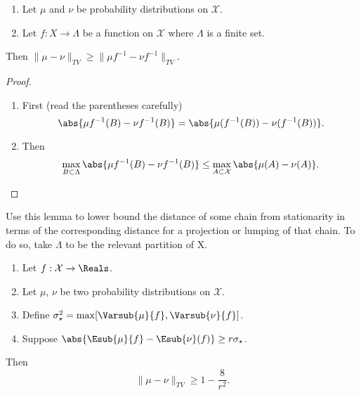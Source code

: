 \documentclass[12pt]{article}
\begin{document}
\begin{lemma}
    \label{thm:convergencestationary:lem710}
    \begin{enumerate}
        \item
            Let \( \mu \) and \( \nu \) be probability distributions on \(
            \mathcal{X} \).
        \item
            Let \( f:X \to \Lambda \) be a function on \( \mathcal{X} \)
            where \( \Lambda \) is a finite set.
    \end{enumerate}
    Then \( \| \mu - \nu \|_{TV} \ge \| \mu f^{-1} - \nu f^{-1} \|_{TV} \).
\end{lemma}

\begin{proof}
    \begin{enumerate}
        \item
            First (read the parentheses carefully)
            \[
                \abs{\mu f^{-1}(B) - \nu f^{-1}(B)} = \abs{\mu (f^{-1}(B))
                - \nu (f^{-1}(B))}.
            \]
        \item
            Then
            \[
                \max_{B \subset \Lambda}\abs{\mu f^{-1}(B) - \nu f^{-1}(B)}
                \le \max_{A \subset \mathcal{X}}\abs{\mu (A) - \nu (A)}.
            \]

    \end{enumerate}
\end{proof}

\begin{remark}
    Use this lemma to lower bound the distance of some chain from
    stationarity in terms of the corresponding distance for a projection
    or lumping of that chain.  To do so, take \( \Lambda \) to be the
    relevant partition of X.
\end{remark}

\begin{proposition}
    \label{thm:convergencestationary:prop79}
    \begin{enumerate}
        \item
            Let \( f:\mathcal{X} \to \Reals \).
        \item
            Let \( \mu \), \( \nu \) be two probability distributions on
            \( \mathcal{X} \).
        \item
          Define \( \sigma_{\star}^2 = \max[ \Varsub{\mu}{f},
            \Varsub{\nu}{f} ] \).
        \item
            Suppose \( \abs{ \Esub{\mu}{f} - \Esub{\nu}(f)} \ge r \sigma_
            {\star} \).
    \end{enumerate}
    Then
    \[
        \| \mu - \nu \|_{TV} \ge 1 - \frac{8}{r^2}.
    \]
\end{proposition}
\end{document}

